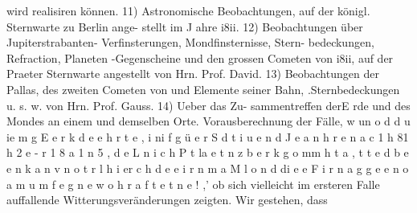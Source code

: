 \documentclass[12pt,a4paper]{article}
\begin{document}
wird realisiren können. 11) Astronomische Beobachtungen, auf der königl. Sternwarte zu Berlin ange-\newline
stellt im J ahre i8ii. 12) Beobachtungen über Jupiterstrabanten- Verfinsterungen, Mondfinsternisse, Stern-\newline
bedeckungen, Refraction, Planeten -Gegenscheine und den grossen Cometen von i8ii, auf der Praeter\newline
Sternwarte angestellt von Hrn. Prof. David. 13) Beobachtungen der Pallas, des zweiten Cometen von und Elemente seiner Bahn, .Sternbedeckungen u. s. w. von Hrn. Prof. Gauss. 14) Ueber das Zu-\newline
sammentreffen derE rde und des Mondes an einem und demselben Orte. Vorausberechnung der Fälle,\newline
w un o d d u ie m g E e r k d e e h r t e , i ni f g ü e r S d t i u e n d J e a n h r e n a c 1 h 81 h 2 e - r 1 8 a 1 n 5 , d e L n i c h P t la e t n z b e r k g o mm h t a , t t e d b e e n k a n v n o t r l h i er c h d e e i r n m a M l o n d di e e F i r n a g g e e n o a m u m f e g n e w o h r a f t e t n e ! ,'\newline
ob sich vielleicht im ersteren Falle auffallende Witterungsveränderungen zeigten. Wir gestehen, dass\newline
\end{document}
